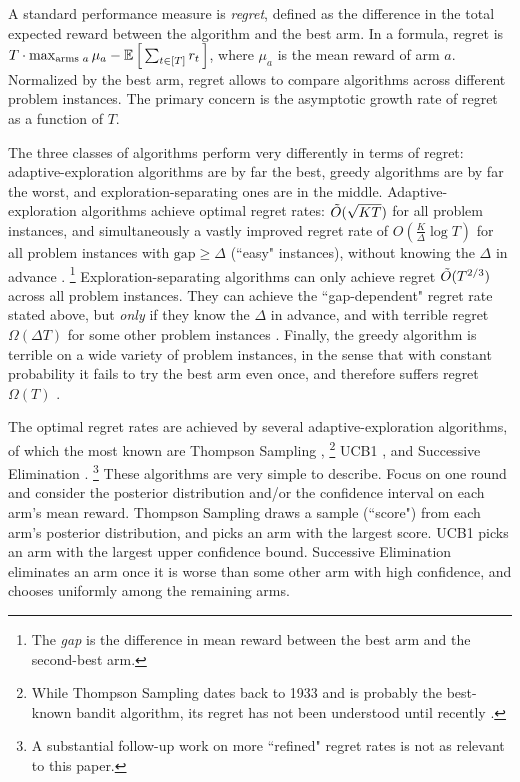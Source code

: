 A standard performance measure is \emph{regret}, defined as the difference in the total expected reward between the algorithm and the best arm. In a formula, regret is
    $T\cdot \max_{\text{arms $a$}}\mu_a
    -  \E\sbr{ \sum_{t\in[T]} r_t }$,
where $\mu_a$ is the mean reward of arm $a$.
Normalized by the best arm, regret allows to compare algorithms across different problem instances.
The primary concern is the asymptotic growth rate of regret as a function of $T$.

The three classes of algorithms perform very differently in terms of regret: adaptive-exploration algorithms are by far the best, greedy algorithms are by far the worst, and exploration-separating ones are in the middle. Adaptive-exploration algorithms achieve optimal regret rates:
    $\tilde{O}(\sqrt{KT})$
for all problem instances, and simultaneously a vastly improved regret rate of
    $O(\tfrac{K}{\Delta}\log T)$
for all problem instances with $\text{gap}\geq \Delta$ (``easy" instances), without knowing the $\Delta$ in advance
\citep{Lai-Robbins-85,bandits-ucb1,bandits-exp3}.%
\footnote{The \emph{gap} is the difference in mean reward between the best arm and the second-best arm.}
Exploration-separating algorithms can only achieve regret $\tilde{O}(T^{2/3})$ across all problem instances. They can achieve the ``gap-dependent" regret rate stated above, but \emph{only} if they know the $\Delta$ in advance, and with terrible regret $\Omega(\Delta T)$ for some other problem instances \citep{MechMAB-ec09}. Finally, the greedy algorithm is terrible on a wide variety of problem instances, in the sense that with constant probability it fails to try the best arm even once, and therefore suffers regret $\Omega(T)$
\citep[see Chapter 11.2 in][]{slivkins-MABbook}.


The optimal regret rates are achieved by several adaptive-exploration  algorithms, of which the most known are
Thompson Sampling \citep{Thompson-1933,TS-survey-FTML18},%
\footnote{While Thompson Sampling dates back to 1933 and is probably the best-known bandit algorithm, its regret has not been understood until recently \citep{Shipra-colt12,Kaufmann-alt12,Shipra-aistats13}.}
UCB1 \citep{bandits-ucb1},
and Successive Elimination \citep{EvenDar-icml06}.%
\footnote{A substantial follow-up work on more ``refined" regret rates is not as relevant to this paper.}
These algorithms are very simple to describe. Focus on one round and consider the posterior distribution and/or the confidence interval on each arm's mean reward. Thompson Sampling draws a sample (``score") from each arm's posterior distribution, and picks an arm with the largest score. UCB1 picks an arm with the largest upper confidence bound. Successive Elimination eliminates an arm once it is worse than some other arm with high confidence, and chooses uniformly among the remaining arms.

